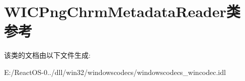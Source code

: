 \hypertarget{class_w_i_c_png_chrm_metadata_reader}{}\section{W\+I\+C\+Png\+Chrm\+Metadata\+Reader类 参考}
\label{class_w_i_c_png_chrm_metadata_reader}


该类的文档由以下文件生成\+:\begin{DoxyCompactItemize}
\item 
E\+:/\+React\+O\+S-\/0../dll/win32/windowscodecs/windowscodecs\+\_\+wincodec.\+idl\end{DoxyCompactItemize}
